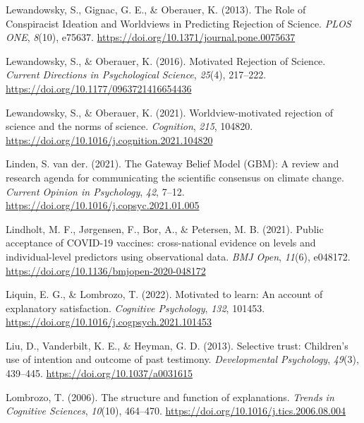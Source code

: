 \documentclass[
  jou,
  floatsintext,
  longtable,
  nolmodern,
  notxfonts,
  notimes,
  colorlinks=true,linkcolor=blue,citecolor=blue,urlcolor=blue]{apa7}
\newlength{\cslhangindent}
\newenvironment{CSLReferences}[2] %
 {\begin{list}{}{%
  \setlength{\itemindent}{0pt}
  \setlength{\leftmargin}{0pt}
  \setlength{\parsep}{0pt}
  \ifodd #1
   \setlength{\leftmargin}{\cslhangindent}
   \setlength{\itemindent}{-1\cslhangindent}
  \fi
  \setlength{\itemsep}{#2\baselineskip}}}
 {\end{list}}
\begin{document}
\begin{CSLReferences}{1}{0}
Lewandowsky, S., Gignac, G. E., \& Oberauer, K. (2013). The Role of
Conspiracist Ideation and Worldviews in Predicting Rejection of Science.
\emph{PLOS ONE}, \emph{8}(10), e75637.
\url{https://doi.org/10.1371/journal.pone.0075637}

Lewandowsky, S., \& Oberauer, K. (2016). Motivated Rejection of Science.
\emph{Current Directions in Psychological Science}, \emph{25}(4),
217--222. \url{https://doi.org/10.1177/0963721416654436}

Lewandowsky, S., \& Oberauer, K. (2021). Worldview-motivated rejection
of science and the norms of science. \emph{Cognition}, \emph{215},
104820. \url{https://doi.org/10.1016/j.cognition.2021.104820}

Linden, S. van der. (2021). The Gateway Belief Model (GBM): A review and
research agenda for communicating the scientific consensus on climate
change. \emph{Current Opinion in Psychology}, \emph{42}, 7--12.
\url{https://doi.org/10.1016/j.copsyc.2021.01.005}

Lindholt, M. F., Jørgensen, F., Bor, A., \& Petersen, M. B. (2021).
Public acceptance of COVID-19 vaccines: cross-national evidence on
levels and individual-level predictors using observational data.
\emph{BMJ Open}, \emph{11}(6), e048172.
\url{https://doi.org/10.1136/bmjopen-2020-048172}

Liquin, E. G., \& Lombrozo, T. (2022). Motivated to learn: An account of
explanatory satisfaction. \emph{Cognitive Psychology}, \emph{132},
101453. \url{https://doi.org/10.1016/j.cogpsych.2021.101453}

Liu, D., Vanderbilt, K. E., \& Heyman, G. D. (2013). Selective trust:
Children's use of intention and outcome of past testimony.
\emph{Developmental Psychology}, \emph{49}(3), 439--445.
\url{https://doi.org/10.1037/a0031615}

Lombrozo, T. (2006). The structure and function of explanations.
\emph{Trends in Cognitive Sciences}, \emph{10}(10), 464--470.
\url{https://doi.org/10.1016/j.tics.2006.08.004}


\end{CSLReferences}
\end{document}
